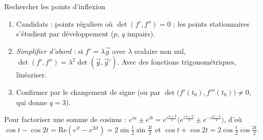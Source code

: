 \documentclass[a4paper,11pt]{article}
\numberwithin{equation}{section}
\numberwithin{figure}{section}
\numberwithin{table}{section}
\theoremstyle{enonce}
\theoremstyle{exemple}
\theoremstyle{remarque}
\newcommand{\ve}[1]{\vec{#1}}
\begin{document}
\begin{methode}{Rechercher les points d'inflexion}\label{meth:inflexion}
\begin{enumerate}
\item Candidats : points réguliers où $\det(f',f'')=0$ ; les points stationnaires s'étudient par développement ($p$, $q$ impairs).
\item \emph{Simplifier d'abord} : si $f'=\lambda\ve g$ avec $\lambda$ scalaire non nul, $\det(f',f'')=\lambda^2\det(\ve g,\ve g')$.
      Avec des fonctions trigonométriques, linéariser.
\item Confirmer par le changement de signe (ou par $\det\big(f'(t_0),f'''(t_0)\big)\neq0$, qui donne $q=3$).
\end{enumerate}
\end{methode}

\begin{astuce}
Pour factoriser une somme de cosinus : $e^{ia}\pm e^{ib}=e^{i\frac{a+b}2}\big(e^{i\frac{a-b}2}\pm e^{-i\frac{a-b}2}\big)$, d'où
$\cos t-\cos2t=\mathrm{Re}(e^{it}-e^{2it})=2\sin\frac t2\sin\frac{3t}2$ et $\cos t+\cos2t=2\cos\frac t2\cos\frac{3t}2$.
\end{astuce}
\end{document}

